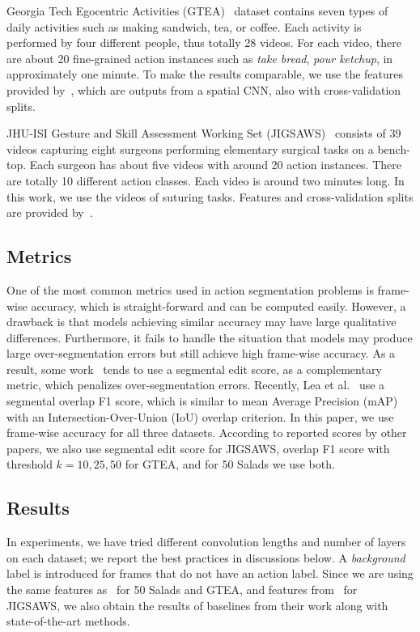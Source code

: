 \documentclass{article}
\begin{document}
Georgia Tech Egocentric Activities (GTEA)~\cite{gtea} dataset contains seven types of daily activities such as making sandwich, tea, or coffee. Each activity is performed by four different people, thus totally 28 videos. For each video, there are about 20 fine-grained action instances such as \textit{take bread}, \textit{pour ketchup}, in approximately one minute. To make the results comparable, we use the features provided by~\cite{LeFlViCVPR2017}, which are outputs from a spatial CNN, also with cross-validation splits.

JHU-ISI Gesture and Skill Assessment Working Set (JIGSAWS)~\cite{jigsaws} consists of 39 videos capturing eight surgeons performing elementary surgical tasks on a bench-top. Each surgeon has about five videos with around 20 action instances. There are totally 10 different action classes. Each video is around two minutes long. In this work, we use the videos of suturing tasks. Features and cross-validation splits are provided by~\cite{tcnw}.


\subsection{Metrics}

One of the most common metrics used in action segmentation problems is frame-wise accuracy, which is straight-forward and can be computed easily. However, a drawback  is that models achieving similar accuracy may have large qualitative differences. Furthermore, it fails to handle the situation that models may produce large over-segmentation errors but still achieve high frame-wise accuracy. As a result, some work~\cite{scnn,lea} tends to use a segmental edit score, as a complementary metric, which penalizes over-segmentation errors. Recently, Lea et al.~\cite{LeFlViCVPR2017} use a segmental overlap F1 score, which is similar to mean Average Precision (mAP) with an Intersection-Over-Union (IoU) overlap criterion. In this paper, we use frame-wise accuracy for all three datasets. According to reported scores by other papers, we also use segmental edit score for JIGSAWS, overlap F1 score with threshold $k=10, 25, 50$ for GTEA, and for 50 Salads we use both. 

\subsection{Results}

In experiments, we have tried different convolution lengths and number of layers on each dataset; we report the best practices in discussions below. A \textit{background} label is introduced for frames that do not have an action label. Since we are using the same features as~\cite{LeFlViCVPR2017} for 50 Salads and GTEA, and features from~\cite{tcnw} for JIGSAWS, we also obtain the results of baselines from their work along with state-of-the-art methods. 
\end{document}
